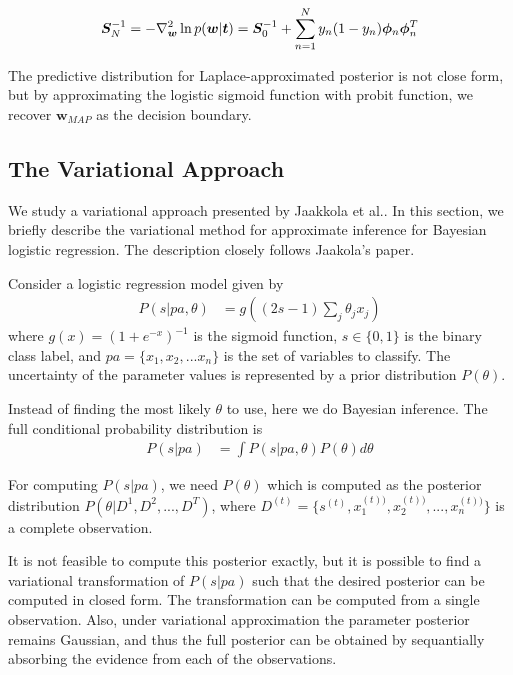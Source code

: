\begin{equation}
\bm{S}_N^{-1} = -\nabla^2_{\bm{w}} \ln p(\bm{w}|\bm{t})
= \bm{S}_0^{-1} + \sum_{n=1}^N y_n(1-y_n) \bm{\phi}_n \bm{\phi}_n^T
\end{equation}

The predictive distribution for Laplace-approximated posterior is not close
form, but by approximating the logistic sigmoid function with probit function,
we recover $\bm{w}_{MAP}$ as the decision boundary.

\subsection{The Variational Approach}
We study a variational approach presented by Jaakkola et al.\cite{Jaakkola96avariational}. In this section, we briefly describe the variational method for approximate inference for Bayesian logistic regression. The description closely follows Jaakola's paper.

Consider a logistic regression model given by 
\begin{align}
  P(s|pa, \theta) &= g((2s - 1)\sum_j\theta_jx_j)
\end{align}
where $g(x) = (1 + e^{-x})^{-1}$ is the sigmoid function, $s \in \{0, 1\}$ is the binary class label, and $pa = \{x_1, x_2, ... x_n\}$ is the set of variables to classify. The uncertainty of the parameter values is represented by a prior distribution $P(\theta)$.

Instead of finding the most likely $\theta$ to use, here we do Bayesian inference. The full conditional probability distribution is
\begin{align}
P(s|pa) &= \int P(s|pa, \theta)P(\theta)d\theta
\end{align}

For computing $P(s|pa)$, we need $P(\theta)$ which is computed as the posterior distribution $P(\theta| D^1, D^2, ..., D^T)$, where $D^{(t)} = \{s^{(t)}, x^{(t))}_1, x^{(t))}_2, ..., x^{(t))}_n\}$ is a complete observation. 

It is not feasible to compute this posterior exactly, but it is possible to find a variational transformation of $P(s|pa)$ such that the desired posterior can be computed in closed form. The transformation can be computed from a single observation. Also, under variational approximation the parameter posterior remains Gaussian, and thus the full posterior can be obtained by sequantially absorbing the evidence from each of the observations.


